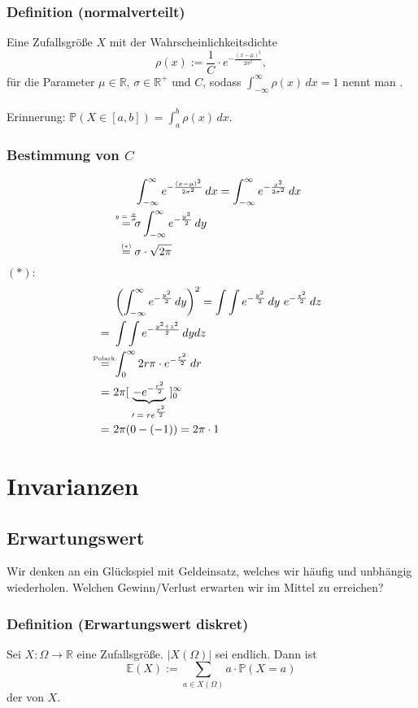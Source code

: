 \subsubsection{Definition (normalverteilt)}
Eine Zufallsgr\"o\ss{}e $X$ mit der Wahrscheinlichkeitsdichte
\[\rho(x):=\frac{1}{C}\cdot e^{-\frac{(x-\mu)^2}{2\sigma^{2}}},\]
f\"ur die Parameter $\mu\in\mathbb{R}$, $\sigma\in\mathbb{R}^+$ und $C$, sodass $\int_{-\infty}^{\infty}\rho(x)\,dx=1$ nennt man .
\\~\\
Erinnerung: $\mathbb{P}(X\in[a,b])=\int_a^b\rho(x)\,dx$.
\subsubsection{Bestimmung von $C$}
\begin{align*}
    &\int_{-\infty}^{\infty}e^{-\frac{(x-\mu)^2}{2\sigma^2}}\,dx
    =\int_{-\infty}^{\infty}e^{-\frac{x^2}{2\sigma^2}}\,dx
    \\\textabove{$y=\frac{x}{\sigma}$}{=}\ &\sigma\int_{-\infty}^{\infty}e^{-\frac{y^2}{2}}\,dy
    \\\textabove{$(*)$}{=}\ &\sigma\cdot\sqrt{2\pi}
\end{align*}
$(*)$:
\begin{align*}
    &\left(\int_{-\infty}^{\infty}e^{-\frac{y^2}{2}}\,dy\right)^2=\int\int e^{-\frac{y^2}{2}}\,dy\ e^{-\frac{z^2}{2}}\,dz
    \\=\ &\int\int e^{-\frac{y^2+z^2}{2}}\,dydz
    \\\textabove{Polark.}{=}\ &\int_{0}^{\infty}2r\pi\cdot e^{-\frac{r^2}{2}}\,dr
    \\=\ &2\pi[\ \ubr{-e^{-\frac{r^2}{2}}}{$\prime=re^{\frac{r^2}{2}}$}\ ]_0^\infty
    \\=\ &2\pi(0-(-1))=2\pi\cdot1
\end{align*}
\newpage
\section{Invarianzen}
\subsection{Erwartungswert}
Wir denken an ein Gl\"uckspiel mit Geldeinsatz, welches wir h\"aufig und unbh\"angig wiederholen. Welchen Gewinn/Verlust erwarten wir im Mittel zu erreichen?
\subsubsection{Definition (Erwartungswert diskret)}
Sei $X\colon\Omega\to\mathbb{R}$ eine Zufallsgr\"o\ss{}e. $|X(\Omega)|$ sei endlich. Dann ist
\[\mathbb{E}(X):=\sum_{a\in X(\Omega)}a\cdot\mathbb{P}(X=a)\]
der  von $X$.
